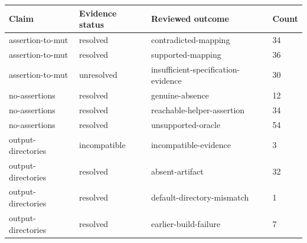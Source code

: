   \renewcommand{\theHreporttablerow}{rq6_reconstruction_outcomes.\arabic{reporttablerow}}
  \setcounter{reporttablerow}{0}
  \begin{tabular}{llll}
  \toprule
  Claim & Evidence status & Reviewed outcome & Count \\
  \midrule
  {reporttablerow}\label{tabrow:rq6_reconstruction_outcomes:assertion-to-mut@3Aresolved@3Acontradicted-mapping}assertion-to-mut & resolved & contradicted-mapping & 34 \\
  {reporttablerow}\label{tabrow:rq6_reconstruction_outcomes:assertion-to-mut@3Aresolved@3Asupported-mapping}assertion-to-mut & resolved & supported-mapping & 36 \\
  {reporttablerow}\label{tabrow:rq6_reconstruction_outcomes:assertion-to-mut@3Aunresolved@3Ainsufficient-specification-evidence}assertion-to-mut & unresolved & insufficient-specification-evidence & 30 \\
  {reporttablerow}\label{tabrow:rq6_reconstruction_outcomes:no-assertions@3Aresolved@3Agenuine-absence}no-assertions & resolved & genuine-absence & 12 \\
  {reporttablerow}\label{tabrow:rq6_reconstruction_outcomes:no-assertions@3Aresolved@3Areachable-helper-assertion}no-assertions & resolved & reachable-helper-assertion & 34 \\
  {reporttablerow}\label{tabrow:rq6_reconstruction_outcomes:no-assertions@3Aresolved@3Aunsupported-oracle}no-assertions & resolved & unsupported-oracle & 54 \\
  {reporttablerow}\label{tabrow:rq6_reconstruction_outcomes:output-directories@3Aincompatible@3Aincompatible-evidence}output-directories & incompatible & incompatible-evidence & 3 \\
  {reporttablerow}\label{tabrow:rq6_reconstruction_outcomes:output-directories@3Aresolved@3Aabsent-artifact}output-directories & resolved & absent-artifact & 32 \\
  {reporttablerow}\label{tabrow:rq6_reconstruction_outcomes:output-directories@3Aresolved@3Adefault-directory-mismatch}output-directories & resolved & default-directory-mismatch & 1 \\
  {reporttablerow}\label{tabrow:rq6_reconstruction_outcomes:output-directories@3Aresolved@3Aearlier-build-failure}output-directories & resolved & earlier-build-failure & 7 \\
  \bottomrule
  \end{tabular}

